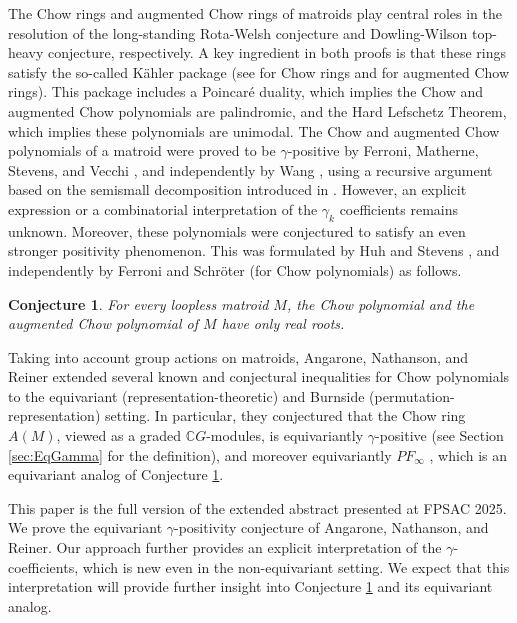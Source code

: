 \documentclass[reqno]{amsart}
\newtheorem{conj}[thm]{Conjecture}
\theoremstyle{definition}
\theoremstyle{remark}
\begin{document}
The Chow rings and augmented Chow rings of matroids play central roles in the resolution of the long-standing Rota-Welsh conjecture and Dowling-Wilson top-heavy conjecture, respectively. A key ingredient in both proofs is that these rings satisfy the so-called K\"{a}hler package (see \cite{AHK2018} for Chow rings and \cite{BHMPW2020+} for augmented Chow rings). 
This package includes a Poincar\'{e} duality, which implies the Chow and augmented Chow polynomials are palindromic, and the Hard Lefschetz Theorem, which implies these polynomials are unimodal. 
The Chow and augmented Chow polynomials of a matroid were proved to be $\gamma$-positive by Ferroni, Matherne, Stevens, and Vecchi \cite{Ferroni2024hilbert}, and independently by Wang \cite[p.33]{Ferroni2024hilbert}, using a recursive argument based on the semismall decomposition introduced in \cite{BHMPW2020}. 
However, an explicit expression or a combinatorial interpretation of the $\gamma_k$ coefficients remains unknown.
Moreover, these polynomials were conjectured to satisfy an even stronger positivity phenomenon. 
This was formulated by Huh and Stevens \cite[Conjecture 4.3.3]{StevenThesis}, and independently by Ferroni and Schr\"{o}ter \cite[Conjecture 8.18]{FerroniSchroter2024} (for Chow polynomials) as follows. 
\begin{conj}\label{conj: Real-rootedChow}
For every loopless matroid $M$, the Chow polynomial and the augmented Chow polynomial of $M$ have only real roots.  
\end{conj}

Taking into account group actions on matroids, Angarone, Nathanson, and Reiner \cite{ANR2023PermRepchow} extended several known and conjectural inequalities for Chow polynomials to the equivariant (representation-theoretic) and Burnside (permutation-representation) setting. 
In particular, they conjectured that the Chow ring $A(M)$, viewed as a graded $\mathbb{C}G$-modules, is equivariantly $\gamma$-positive (see Section \ref{sec:EqGamma} for the definition), and moreover equivariantly $PF_{\infty}$ \cite[Conjecture 4.4 (ii)]{ANR2023PermRepchow}, which is an equivariant analog of Conjecture \ref{conj: Real-rootedChow}.

This paper is the full version of the extended abstract \cite{Liao2024EqGamma} presented at FPSAC 2025.
We prove the equivariant $\gamma$-positivity conjecture of Angarone, Nathanson, and Reiner. Our approach further provides an explicit interpretation of the $\gamma$-coefficients, which is new even in the non-equivariant setting. We expect that this interpretation will provide further insight into Conjecture \ref{conj: Real-rootedChow} and its equivariant analog.
\end{document}
